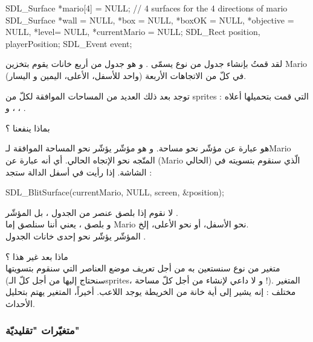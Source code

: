 \begin{Csource}
SDL_Surface *mario[4] = {NULL}; // 4 surfaces for the 4 directions of mario
SDL_Surface *wall = NULL, *box = NULL, *boxOK = NULL, *objective = NULL, *level= NULL, *currentMario = NULL;
SDL_Rect position, playerPosition;
SDL_Event event;
\end{Csource}

لقد قمتُ بإنشاء جدول من نوع 
يسمّى 
.
و هو جدول من أربع خانات يقوم بتخزين 
\textenglish{Mario}
في كلّ من الاتجاهات الأربعة (واحد للأسفل، الأعلى، اليمين و اليسار).

توجد بعد ذلك العديد من المساحات الموافقة لكلّ من 
\textenglish{sprites}
التي قمت بتحميلها أعلاه : 
،
،
و
.

\begin{question}
بماذا ينفعنا
 ؟
\end{question}

هو عبارة عن مؤشّر نحو مساحة. و هو مؤشّر يؤشّر نحو المساحة الموافقة لـ\textenglish{Mario}
المتّجه نحو الإتجاه الحالي. أي أنه عبارة عن 
(\textenglish{Mario}
الحالي) الّذي سنقوم بتسويته في الشاشة. إذا رأيت في أسفل الدالة
ستجد :
\begin{Csource}
SDL_BlitSurface(currentMario, NULL, screen, &position);
\end{Csource}

لا نقوم إذا بلصق عنصر من الجدول
،
بل المؤشّر
.\\
و بلصق 
،
يعني أننا سنلصق إما
\textenglish{Mario}
نحو الأسفل، أو نحو الأعلى، إلخ.\\
المؤشّر
يؤشّر نحو إحدى خانات الجدول
.

ماذا بعد غير هذا ؟\\
متغير
من نوع
سنستعين به من أجل تعريف موضع العناصر التي سنقوم بتسويتها (سنحتاج إليها من أجل كلّ الـ\textenglish{sprites}،
و لا داعي لإنشاء
من أجل كلّ مساحة !).
المتغير
مختلف : إنه يشير إلى أية خانة من الخريطة يوجد اللاعب. أخيراً، المتغير
يهتم بتحليل الأحداث.

\subsubsection{متغيّرات "تقليديّة"}

